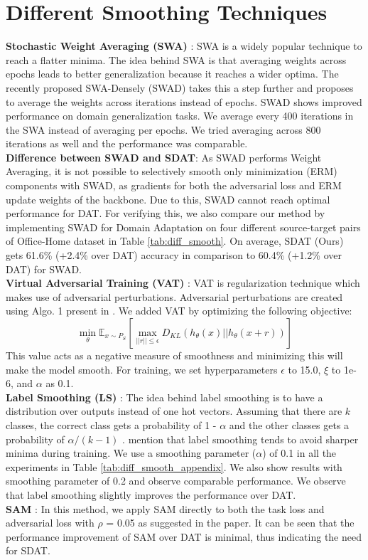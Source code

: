 \documentclass[table,dvipsnames]{article}
\theoremstyle{plain}
\theoremstyle{definition}
\theoremstyle{remark}
\begin{document}
\section{Different Smoothing Techniques}\label{app:smooth_tech}
\textbf{Stochastic Weight Averaging (SWA)} \citep{izmailov2018averaging}: SWA is a widely popular technique to reach a flatter minima. The idea behind SWA is that averaging weights across epochs leads to better generalization because it reaches a wider optima. The recently proposed SWA-Densely (SWAD) \citep{cha2021swad} takes this a step further and proposes to average the weights across iterations instead of epochs. SWAD shows improved performance on domain generalization tasks.
We average every 400 iterations in the SWA instead of averaging per epochs. We tried averaging across 800 iterations as well and the performance was comparable. 
\\
\textbf{Difference between SWAD and SDAT}:
As SWAD performs Weight Averaging, it is not possible to selectively smooth only minimization (ERM) components with SWAD, as gradients for both the adversarial loss and ERM update weights of the backbone. Due to this, SWAD cannot reach optimal performance for DAT. For verifying this, we also compare our method by implementing SWAD for Domain Adaptation on four different source-target pairs of Office-Home dataset in Table \ref{tab:diff_smooth}. On average, SDAT (Ours) gets 61.6\% (+2.4\% over DAT) accuracy in comparison to 60.4\% (+1.2\% over DAT) for SWAD.
\\
\textbf{Virtual Adversarial Training (VAT)} \citep{miyato2019vat}: VAT is regularization technique which makes use of adversarial perturbations. Adversarial perturbations are created using Algo. 1 present in  \citep{miyato2019vat}. We added VAT by optimizing the following objective: 
\begin{equation}
\min_{\theta}  \mathbb{E}_{x \sim P_S}[\underset{||r|| \leq \epsilon}{\max} D_{KL}(h_\theta(x)|| h_{\theta}(x+r))]
\end{equation}
This value acts as a negative measure of smoothness and minimizing this will make the model smooth. For training, we set hyperparameters $\epsilon$ to 15.0, 
$\xi$ to 1e-6, and $\alpha$ as 0.1.\\
\textbf{Label Smoothing (LS)} \citep{szegedy2016rethinking}: The idea behind label smoothing is to have a distribution over outputs instead of one hot vectors. Assuming that there are $k$ classes, the correct class gets a probability of 1 - $\alpha$ and the other classes gets a probability of $\alpha/(k-1)$ . \citep{stutz2021relating} mention that label smoothing tends to avoid sharper minima during training. We use a smoothing parameter ($\alpha$) of 0.1 in all the experiments in Table \ref{tab:diff_smooth_appendix}. We also show results with smoothing parameter of 0.2 and observe comparable performance. We observe that label smoothing slightly improves the performance over DAT. \\
\textbf{SAM} \cite{foret2021sharpnessaware}: In this method, we apply SAM directly to both the task loss and adversarial loss with $\rho$ = 0.05 as suggested in the paper. It can be seen that the performance improvement of SAM over DAT is minimal, thus indicating the need for SDAT.
\end{document}
